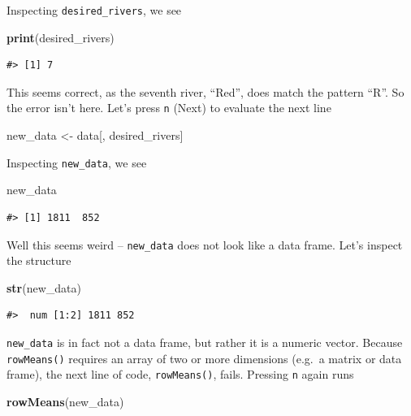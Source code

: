 \documentclass[
]{book}
\newenvironment{Shaded}{\begin{snugshade}}{\end{snugshade}}
\newcommand{\KeywordTok}[1]{\textcolor[rgb]{0.13,0.29,0.53}{\textbf{#1}}}
\newcommand{\NormalTok}[1]{#1}
\newcommand{\StringTok}[1]{\textcolor[rgb]{0.31,0.60,0.02}{#1}}
\begin{document}
Inspecting \texttt{desired\_rivers}, we see

\begin{Shaded}
\begin{Highlighting}[]
\KeywordTok{print}\NormalTok{(desired_rivers)}
\end{Highlighting}
\end{Shaded}

\begin{verbatim}
#> [1] 7
\end{verbatim}

This seems correct, as the seventh river, ``Red'', does match the pattern ``R''. So the error isn't here. Let's press \texttt{n} (Next) to evaluate the next line

\begin{Shaded}
\begin{Highlighting}[]
\NormalTok{new_data <-}\StringTok{ }\NormalTok{data[, desired_rivers]}
\end{Highlighting}
\end{Shaded}

Inspecting \texttt{new\_data}, we see

\begin{Shaded}
\begin{Highlighting}[]
\NormalTok{new_data}
\end{Highlighting}
\end{Shaded}

\begin{verbatim}
#> [1] 1811  852
\end{verbatim}

Well this seems weird -- \texttt{new\_data} does not look like a data frame. Let's inspect the structure

\begin{Shaded}
\begin{Highlighting}[]
\KeywordTok{str}\NormalTok{(new_data)}
\end{Highlighting}
\end{Shaded}

\begin{verbatim}
#>  num [1:2] 1811 852
\end{verbatim}

\texttt{new\_data} is in fact not a data frame, but rather it is a numeric vector. Because \texttt{rowMeans()} requires an array of two or more dimensions (e.g.~a matrix or data frame), the next line of code, \texttt{rowMeans()}, fails. Pressing \texttt{n} again runs

\begin{Shaded}
\begin{Highlighting}[]
\KeywordTok{rowMeans}\NormalTok{(new_data)}
\end{Highlighting}
\end{Shaded}
\end{document}
